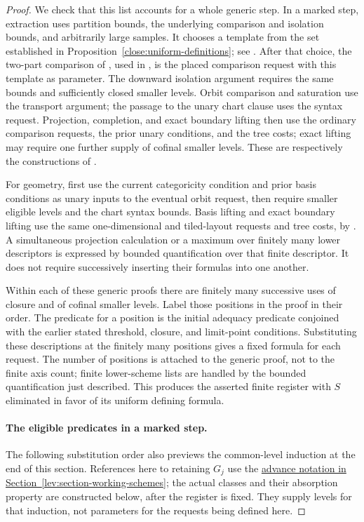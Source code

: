 \begin{proof}
We check that this list accounts for a whole generic step.  In a marked
step, extraction uses partition bounds, the underlying comparison and
isolation bounds, and arbitrarily large samples.  It chooses a template
from the set established in
Proposition~\ref{close:uniform-definitions}; see
.  After that choice, the two-part comparison of
, used in ,
is the placed comparison request with
this template as parameter.  The downward isolation argument requires
the same bounds and sufficiently closed smaller levels.  Orbit
comparison and saturation use the transport argument; the passage to
the unary chart clause uses the syntax request.  Projection, completion,
and exact boundary lifting then use the ordinary comparison requests,
the prior unary conditions, and the tree costs; exact lifting may require
one further supply of cofinal smaller levels.  These are respectively
the constructions of .

For geometry, first use the current categoricity condition and prior
basis conditions as unary inputs to the eventual orbit request, then
require smaller eligible levels and the chart syntax bounds.  Basis
lifting and exact boundary lifting use the same one-dimensional and
tiled-layout requests and tree costs, by
.  A simultaneous projection calculation
or a maximum over finitely many lower descriptors is expressed by
bounded quantification over that finite descriptor.  It does not require
successively inserting their formulas into one another.

Within each of these generic proofs there are finitely many successive
uses of closure and of cofinal smaller levels.  Label those positions
in the proof in their order.  The predicate for a position is the initial
adequacy predicate conjoined with the earlier stated threshold,
closure, and limit-point conditions.  Substituting these descriptions
at the finitely many positions gives a fixed formula for each request.
The number of positions is attached to the generic proof, not to the
finite axis count; finite lower-scheme lists are handled by the bounded
quantification just described.  This produces the asserted finite
register with $S$ eliminated in favor of its uniform defining formula.

\paragraph{The eligible predicates in a marked step.}
The following substitution order also previews the common-level induction
at the end of this section.  References here to retaining $G_j$ use the
\hyperref[lev:closure-preview]{advance notation in Section~\ref*{lev:section-working-schemes}};
the actual classes and
their absorption property are constructed below, after the register is
fixed.  They supply levels for that induction, not parameters for the
requests being defined here.


\end{proof}
